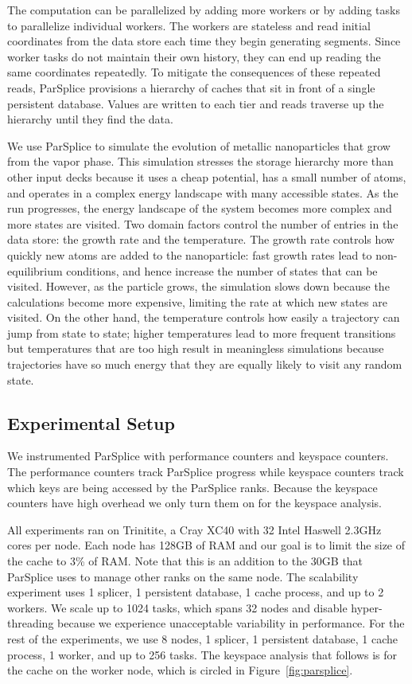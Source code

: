 The computation can be parallelized by adding more workers or by adding tasks
to parallelize individual workers.  The workers are stateless and read initial
coordinates from the data store each time they begin generating segments. Since
worker tasks do not maintain their own history, they can end up reading the
same coordinates repeatedly. To mitigate the consequences of these repeated
reads, ParSplice provisions a hierarchy of caches that sit in front of a single
persistent database.  Values are written to each tier and reads traverse up the
hierarchy until they find the data.  

We use ParSplice to simulate the evolution of metallic nanoparticles that grow
from the vapor phase.  This simulation stresses the storage hierarchy more than
other input decks because it uses a cheap potential, has a small number of
atoms, and operates in a complex energy landscape with many accessible states.
As the run progresses, the energy landscape of the system becomes more complex
and more states are visited.  Two domain factors control the number of entries
in the data store: the growth rate and the temperature. The growth rate
controls how quickly new atoms are added to the nanoparticle: fast growth rates
lead to non-equilibrium conditions, and hence increase the number of states
that can be visited.  However, as the particle grows, the simulation slows down
because the calculations become more expensive, limiting the rate at which new
states are visited.  On the other hand, the temperature controls how easily a
trajectory can jump from state to state; higher temperatures lead to more
frequent transitions but temperatures that are too high result in meaningless
simulations because trajectories have so much energy that they are equally
likely to visit any random state. 

\subsection{Experimental Setup}

We instrumented ParSplice with performance counters and keyspace counters.  The
performance counters track ParSplice progress while keyspace counters track
which keys are being accessed by the ParSplice ranks. Because the keyspace
counters have high overhead we only turn them on for the keyspace analysis.

All experiments ran on Trinitite, a Cray XC40 with 32 Intel Haswell 2.3GHz
cores per node.  Each node has 128GB of RAM and our goal is to limit the size
of the cache to 3\% of RAM. Note that this is an addition to the 30GB that
ParSplice uses to manage other ranks on the same node.  The scalability
experiment uses 1 splicer, 1 persistent database, 1 cache process, and up to 2
workers. We scale up to 1024 tasks, which spans 32 nodes and disable
hyper-threading because we experience unacceptable variability in performance.
For the rest of the experiments, we use 8 nodes, 1 splicer, 1 persistent
database, 1 cache process, 1 worker, and up to 256 tasks.  The keyspace
analysis that follows is for the cache on the worker node, which is circled in
Figure~\ref{fig:parsplice}.  


